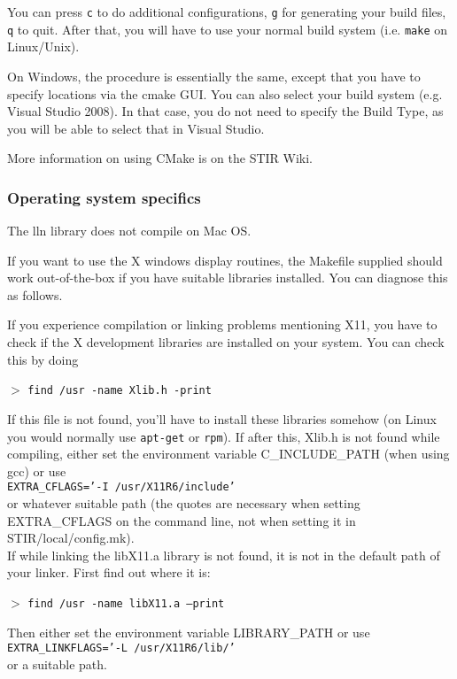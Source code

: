 \documentclass{article}
\newcommand{\cmdline}[1]{\par \noindent $>$ \texttt{#1}\par}
\begin{document}
You can press \texttt{c} to do additional configurations, \texttt{g} for generating
your build files, \texttt{q} to quit. After that, you will have to use your normal
build system (i.e. \texttt{make} on Linux/Unix).

On Windows, the procedure is essentially the same, except that you have to specify locations 
via the cmake GUI. You can also select your build system (e.g. Visual Studio 2008). In that case,
you do not need to specify the Build Type, as you will be able to select that in 
Visual Studio.

More information on using CMake is on the STIR Wiki.

\subsubsection{
Operating system specifics}

{ 
The lln library does not compile on Mac OS. 
}

{ 
}

If you want to use the X windows display routines, the Makefile 
supplied should work out-of-the-box if you have suitable libraries installed. 
You can diagnose this as follows.

{ 
}

If you experience compilation 
or linking problems mentioning X11, you have to check if the 
X development libraries are installed on your system. You can 
check this by doing
\cmdline{find /usr -name Xlib.h -print}

If this file is not found, you'll have to install these libraries 
somehow (on Linux you would normally use \texttt{apt-get} or \texttt{rpm}).
If after this, Xlib.h is not found while compiling, 
either set the environment variable C\_INCLUDE\_PATH (when using 
gcc) or use \\
\texttt{EXTRA\_CFLAGS='-I /usr/X11R6/include' }\\
or whatever suitable path (the quotes are necessary when setting 
EXTRA\_CFLAGS on the command line, not when setting it in 
STIR/local/config.mk).\\
If while linking the libX11.a library is not found, it is not 
in the default path of your linker. First find out where it is:
\cmdline{find /usr -name libX11.a --print}

Then either set the environment variable LIBRARY\_PATH or use \\
\texttt{EXTRA\_LINKFLAGS='-L /usr/X11R6/lib/'}\\
 or a suitable path.
\end{document}
